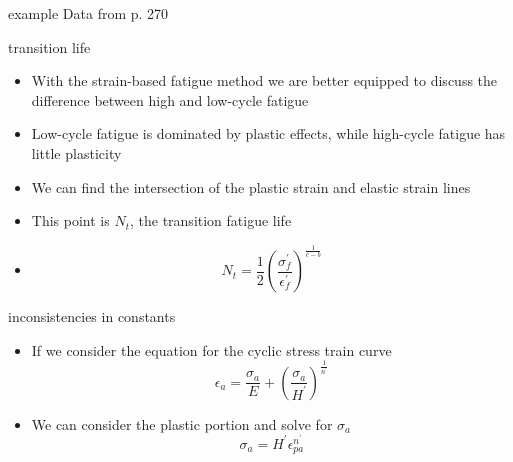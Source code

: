 \documentclass[10pt]{beamer}
\begin{document}
\begin{frame}{example}
	Data from p. 270	
\end{frame}

\begin{frame}{transition life}
	\begin{itemize}[<+->]
		\item With the strain-based fatigue method we are better equipped to discuss the difference between high and low-cycle fatigue
		\item Low-cycle fatigue is dominated by plastic effects, while high-cycle fatigue has little plasticity
		\item We can find the intersection of the plastic strain and elastic strain lines
		\item This point is $N_t$, the transition fatigue life
		\item[] \begin{equation}
		N_t = \frac{1}{2}\left(\frac{\sigma_f^\prime}{\epsilon_f^\prime}\right)^{\frac{1}{c-b}}
		\end{equation}
	\end{itemize}
\end{frame}

\begin{frame}{inconsistencies in constants}
	\begin{itemize}[<+->]
		\item If we consider the equation for the cyclic stress train curve
		\begin{equation}
		\epsilon_a = \frac{\sigma_a}{E} + \left(\frac{\sigma_a}{H^\prime}\right)^{\frac{1}{n^\prime}}
		\end{equation}
		\item We can consider the plastic portion and solve for $\sigma_a$
		\begin{equation}
		\label{eq:stress-life}
		\sigma_a = H^\prime \epsilon_{pa}^{n^\prime}
		\end{equation}
	\end{itemize}
\end{frame}
\end{document}
